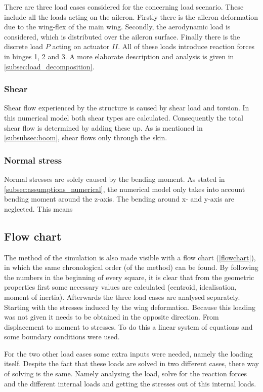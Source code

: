 There are three load cases considered for the concerning load scenario. These include all the loads acting on the aileron.
Firstly there is the aileron deformation due to the wing-flex of the main wing. Secondly, the aerodynamic load is considered, which is distributed over the aileron surface. Finally there is the discrete load $P$ acting on actuator $II$. All of these loads introduce reaction forces in hinges 1, 2 and 3. A more elaborate description and analysis is given in \autoref{subsec:load_decomposition}.

\subsubsection{Shear}
Shear flow experienced by the structure is caused by shear load and torsion. In this numerical model both shear types are calculated. Consequently the total shear flow is determined by adding these up. As is mentioned in \autoref{subsubsec:boom}, shear flows only through the skin.

\subsubsection{Normal stress}
Normal stresses are solely caused by the bending moment. As stated in \autoref{subsec:assumptions_numerical}, the numerical model only takes into account bending moment around the z-axis. The bending around x- and y-axis are neglected.
This means

\subsection{Flow chart}
The method of the simulation is also made visible with a flow chart (\autoref{flowchart}), in which the same chronological order (of the method) can be found. By following the numbers in the beginning of every square, it is clear that from the geometric properties first some necessary values are calculated (centroid, idealisation, moment of inertia). Afterwards the three load cases are analysed separately. Starting with the stresses induced by the wing deformation. Because this loading was not given it needs to be obtained in the opposite direction. From displacement to moment to stresses. To do this a linear system of equations and some boundary conditions were used.

\par
For the two other load cases some extra inputs were needed, namely the loading itself. Despite the fact that these loads are solved in two different cases, there way of solving is the same. Namely analysing the load, solve for the reaction forces and the different internal loads and getting the stresses out of this internal loads.
\

